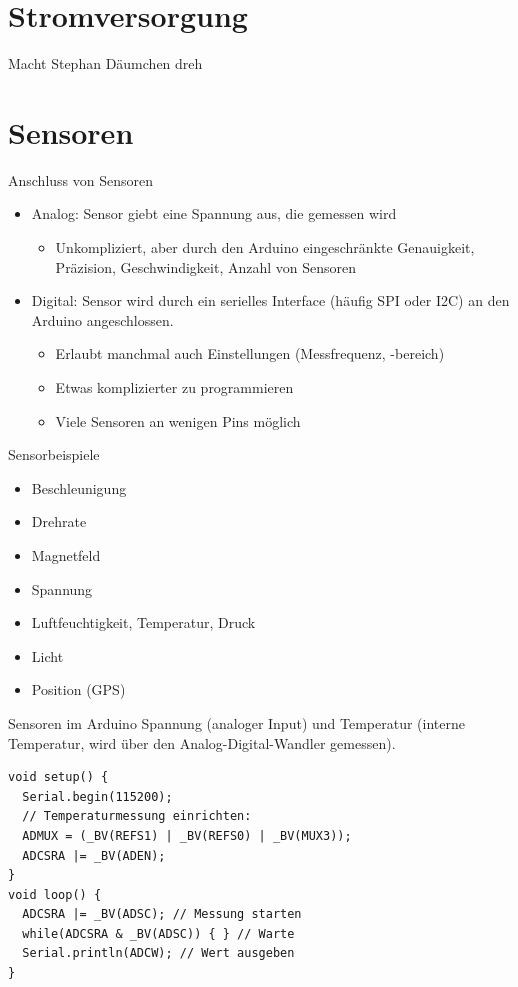 \documentclass[bigger]{beamer}
\begin{document}
\section{Stromversorgung}
\label{sec:org0200a55}
\begin{frame}[label={sec:org7e21bf2}]{Macht Stephan}
\alert{Däumchen dreh}
\end{frame}

\section{Sensoren}
\label{sec:orgc9fa29f}
\begin{frame}[label={sec:orgcc2d7a6}]{Anschluss von Sensoren}
\begin{itemize}
\item Analog: Sensor giebt eine Spannung aus, die gemessen wird
\begin{itemize}
\item Unkompliziert, aber durch den Arduino eingeschränkte Genauigkeit,
Präzision, Geschwindigkeit, Anzahl von Sensoren
\end{itemize}
\item Digital: Sensor wird durch ein serielles Interface (häufig SPI oder
I2C) an den Arduino angeschlossen.
\begin{itemize}
\item Erlaubt manchmal auch Einstellungen (Messfrequenz, -bereich)
\item Etwas komplizierter zu programmieren
\item Viele Sensoren an wenigen Pins möglich
\end{itemize}
\end{itemize}
\end{frame}

\begin{frame}[label={sec:orgdd25bf6}]{Sensorbeispiele}
\begin{itemize}
\item Beschleunigung
\item Drehrate
\item Magnetfeld
\item Spannung
\item Luftfeuchtigkeit, Temperatur, Druck
\item Licht
\item Position (GPS)
\end{itemize}
\end{frame}

\begin{frame}[fragile,label={sec:org0b37a96}]{Sensoren im Arduino}
 Spannung (analoger Input) und Temperatur (interne Temperatur, wird
über den Analog-Digital-Wandler gemessen).

\begin{verbatim}
void setup() {
  Serial.begin(115200);
  // Temperaturmessung einrichten:
  ADMUX = (_BV(REFS1) | _BV(REFS0) | _BV(MUX3));
  ADCSRA |= _BV(ADEN);
}
void loop() {
  ADCSRA |= _BV(ADSC); // Messung starten
  while(ADCSRA & _BV(ADSC)) { } // Warte
  Serial.println(ADCW); // Wert ausgeben
}
\end{verbatim}
\end{frame}
\end{document}
